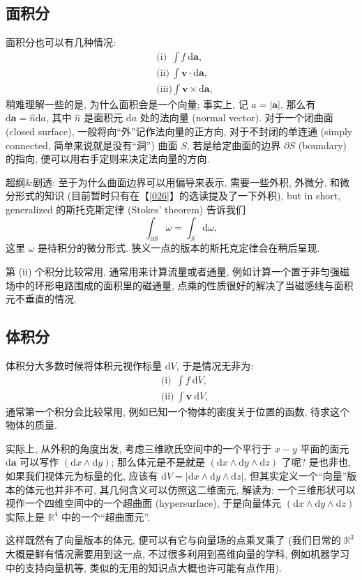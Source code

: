 \subsection{面积分}

面积分也可以有几种情况: \[
\begin{aligned}
&\text{(i)}\ \ \int f\ \mathrm{d}\boldsymbol{a},\\
&\text{(ii)}\ \int\boldsymbol{v}\cdot\mathrm{d}\boldsymbol{a},\\
&\text{(iii)}\int\boldsymbol{v}\times\mathrm{d}\boldsymbol{a},
\end{aligned}
\] 稍难理解一些的是, 为什么面积会是一个向量; 事实上, 记
$a=|\boldsymbol{a}|$, 那么有
$\mathrm{d}\boldsymbol{a}=\hat{n}\mathrm{d}a$, 其中 $\hat{n}$
是面积元 $\mathrm{d}a$ 处的法向量 (normal vector). 对于一个闭曲面
(closed surface), 一般将向``外''记作法向量的正方向, 对于不封闭的单连通
(simply connected, 简单来说就是没有``洞'') 曲面 $S$,
若是给定曲面的边界 $\partial S$ (boundary) 的指向,
便可以用右手定则来决定法向量的方向.

\begin{newquote}
超纲\&剧透: 至于为什么曲面边界可以用偏导来表示, 需要一些外积, 外微分,
和微分形式的知识 (目前暂时只有在【\ref{026}】的选读提及了一下外积), but in
short, generalized 的斯托克斯定律 (Stokes' theorem) 告诉我们 \[
\int_{\partial S}\omega=\int_S\mathrm{d}\omega,
\] 这里 $\omega$ 是待积分的微分形式.
狭义一点的版本的斯托克定律会在稍后呈现.
\end{newquote}

第 (ii) 个积分比较常用, 通常用来计算流量或者通量,
例如计算一个置于非匀强磁场中的环形电路围成的面积里的磁通量,
点乘的性质很好的解决了当磁感线与面积元不垂直的情况.

\subsection{体积分}

体积分大多数时候将体积元视作标量 $\mathrm{d}V$, 于是情况无非为: \[
\begin{aligned}
&\text{(i)}\ \ \int f\ \mathrm{d}V,\\
&\text{(ii)}\ \int\boldsymbol{v}\ \mathrm{d}V,
\end{aligned}
\] 通常第一个积分会比较常用, 例如已知一个物体的密度关于位置的函数,
待求这个物体的质量.

\begin{newquote}
实际上, 从外积的角度出发, 考虑三维欧氏空间中的一个平行于 $x-y$
平面的面元 $\mathrm{d}\boldsymbol{a}$ 可以写作
$(\mathrm{d}x\wedge\mathrm{d}y)$; 那么体元是不是就是
$(\mathrm{d}x\wedge\mathrm{d}y\wedge\mathrm{d}z)$ 了呢? 是也非也,
如果我们视体元为标量的化, 应该有
$\mathrm{d}V=|\mathrm{d}x\wedge\mathrm{d}y\wedge\mathrm{d}z|$,
但其实定义一个``向量''版本的体元也并非不可,
其几何含义可以仿照这二维面元, 解读为:
一个三维形状可以视作一个四维空间中的一个超曲面 (hypersurface),
于是向量体元 $(\mathrm{d}x\wedge\mathrm{d}y\wedge\mathrm{d}z)$
实际上是 $\mathbb{R}^4$ 中的一个``超曲面元''.

这样既然有了向量版本的体元, 便可以有它与向量场的点乘叉乘了 (我们日常的
$\mathbb{R}^3$ 大概是鲜有情况需要用到这一点,
不过很多利用到高维向量的学科, 例如机器学习中的支持向量机等,
类似的无用的知识点大概也许可能有点作用).
\end{newquote}
